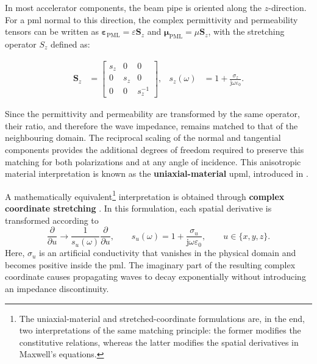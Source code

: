 In most accelerator components, the beam pipe is oriented along the $z$-direction. For a \gls{pml} normal to this direction, the complex permittivity and permeability tensors can be written as $\boldsymbol{\varepsilon}_{\mathrm{PML}}=\varepsilon\mathbf{S}_z$ and $\boldsymbol{\mu}_{\mathrm{PML}}=
\mu\mathbf{S}_z$, with the stretching operator $S_z$ defined as:

\begin{equation}
\begin{aligned}
\mathbf{S}_z
&=
\begin{bmatrix}
s_z & 0 & 0\\ 0 & s_z & 0\\ 0 & 0 & s_z^{-1}
\end{bmatrix},
& s_z(\omega) &= 1+
\frac{\sigma_z}
{\mathrm{j}\omega\varepsilon_0}.
\end{aligned}
\label{eq:pml_uniaxial_tensor}
\end{equation}

Since the permittivity and permeability are transformed by the same operator, their ratio, and therefore the wave impedance, remains matched to that of the neighbouring domain. The reciprocal scaling of the normal and tangential components provides the additional degrees of freedom required to preserve this matching for both polarizations and at any angle of incidence. This anisotropic material interpretation is known as the \textbf{uniaxial-material} \gls{upml}, introduced in \cite{sacksPerfectlyMatchedAnisotropic1995}.

A mathematically equivalent\footnote{The uniaxial-material and stretched-coordinate formulations are, in the end, two interpretations of the same matching principle: the former modifies the constitutive relations, whereas the latter modifies the spatial derivatives in Maxwell's equations.} interpretation is obtained through \textbf{complex coordinate stretching} \cite{846b0097a9604e3493779e861b81255c}. In this formulation, each spatial derivative is transformed according to
%
\begin{equation}
\frac{\partial}{\partial u}
\longrightarrow
\frac{1}{s_u(\omega)}
\frac{\partial}{\partial u},
\qquad
s_u(\omega) = 1+
\frac{\sigma_u}
{\mathrm{j}\omega\varepsilon_0},
\qquad
u\in\{x,y,z\}.
\label{eq:pml_coordinate_stretching}
\end{equation}
%
Here, $\sigma_u$ is an artificial conductivity that vanishes in the physical domain and becomes positive inside the \gls{pml}. The imaginary part of the resulting complex coordinate causes propagating waves to decay exponentially without introducing an impedance discontinuity.

